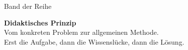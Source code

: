 \begin{titlepage}
  \centering
  \vspace*{20mm}

  {\Huge\sffamily\bfseries \BandTitel\par}
  \vspace{6mm}
  {\Large\sffamily \BandUntertitel\par}
  \vspace{16mm}
  {\large\sffamily Band \BandNummer{} der Reihe\par}
  \vspace{2mm}
  {\Large\sffamily\bfseries \BuchReihe\par}
  \vfill

  \begin{tcolorbox}[
    colback=WerkstattHellblau,
    colframe=WerkstattBlau,
    width=0.82\textwidth, arc=3mm]
  \centering
  \textbf{Didaktisches Prinzip}\\[2mm]
  Vom konkreten Problem zur allgemeinen Methode.\\
  Erst die Aufgabe, dann die Wissenslücke, dann die Lösung.
  \end{tcolorbox}

  \vfill
  {\large \BandAutor\par}
  \vspace{4mm}
  {\large \BandVersion\par}
\end{titlepage}
